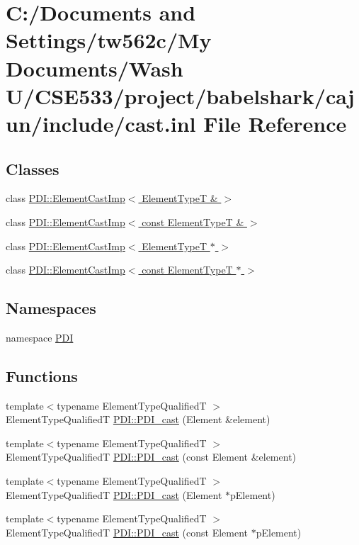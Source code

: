 \hypertarget{cast_8inl}{
\section{C:/Documents and Settings/tw562c/My Documents/Wash U/CSE533/project/babelshark/cajun/include/cast.inl File Reference}
\label{cast_8inl}
}
\subsection*{Classes}
\begin{CompactItemize}
\item 
class \hyperlink{class_p_d_i_1_1_element_cast_imp_3_01_element_type_t_01_6_01_4}{PDI::ElementCastImp$<$ ElementTypeT \& $>$}
\item 
class \hyperlink{class_p_d_i_1_1_element_cast_imp_3_01const_01_element_type_t_01_6_01_4}{PDI::ElementCastImp$<$ const ElementTypeT \& $>$}
\item 
class \hyperlink{class_p_d_i_1_1_element_cast_imp_3_01_element_type_t_01_5_01_4}{PDI::ElementCastImp$<$ ElementTypeT $\ast$ $>$}
\item 
class \hyperlink{class_p_d_i_1_1_element_cast_imp_3_01const_01_element_type_t_01_5_01_4}{PDI::ElementCastImp$<$ const ElementTypeT $\ast$ $>$}
\end{CompactItemize}
\subsection*{Namespaces}
\begin{CompactItemize}
\item 
namespace \hyperlink{namespace_p_d_i}{PDI}
\end{CompactItemize}
\subsection*{Functions}
\begin{CompactItemize}
\item 
{\footnotesize template$<$typename ElementTypeQualifiedT $>$ }\\ElementTypeQualifiedT \hyperlink{namespace_p_d_i_91e7acfd6c982ef09cc58d6acbfe5cbe}{PDI::PDI\_\-cast} (Element \&element)
\item 
{\footnotesize template$<$typename ElementTypeQualifiedT $>$ }\\ElementTypeQualifiedT \hyperlink{namespace_p_d_i_b579ac392aa69d9abfae65846e42f4e0}{PDI::PDI\_\-cast} (const Element \&element)
\item 
{\footnotesize template$<$typename ElementTypeQualifiedT $>$ }\\ElementTypeQualifiedT \hyperlink{namespace_p_d_i_9995a6cf01ffe58f1d6159947a41d0aa}{PDI::PDI\_\-cast} (Element $\ast$pElement)
\item 
{\footnotesize template$<$typename ElementTypeQualifiedT $>$ }\\ElementTypeQualifiedT \hyperlink{namespace_p_d_i_9940546f948318c316306e3145ed765b}{PDI::PDI\_\-cast} (const Element $\ast$pElement)
\end{CompactItemize}
